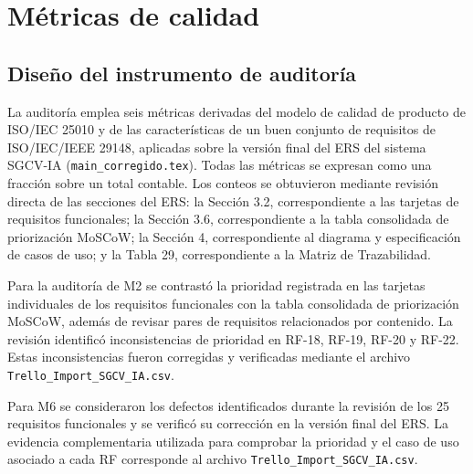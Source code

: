 
\chapter{Métricas de calidad}
\label{sec:metricas}

\section{Diseño del instrumento de auditoría}

La auditoría emplea seis métricas derivadas del modelo de calidad de producto de
ISO/IEC 25010 y de las características de un buen conjunto de requisitos de
ISO/IEC/IEEE 29148, aplicadas sobre la versión final del ERS del sistema SGCV-IA
(\texttt{main\_corregido.tex}). Todas las métricas se expresan como una fracción
sobre un total contable. Los conteos se obtuvieron mediante revisión directa de
las secciones del ERS: la Sección 3.2, correspondiente a las tarjetas de
requisitos funcionales; la Sección 3.6, correspondiente a la tabla consolidada
de priorización MoSCoW; la Sección 4, correspondiente al diagrama y
especificación de casos de uso; y la Tabla 29, correspondiente a la Matriz de
Trazabilidad.

Para la auditoría de M2 se contrastó la prioridad registrada en las tarjetas
individuales de los requisitos funcionales con la tabla consolidada de
priorización MoSCoW, además de revisar pares de requisitos relacionados por
contenido. La revisión identificó inconsistencias de prioridad en RF-18,
RF-19, RF-20 y RF-22. Estas inconsistencias fueron corregidas y verificadas
mediante el archivo \texttt{Trello\_Import\_SGCV\_IA.csv}.

Para M6 se consideraron los defectos identificados durante la revisión de los
25 requisitos funcionales y se verificó su corrección en la versión final del
ERS. La evidencia complementaria utilizada para comprobar la prioridad y el
caso de uso asociado a cada RF corresponde al archivo
\texttt{Trello\_Import\_SGCV\_IA.csv}.

